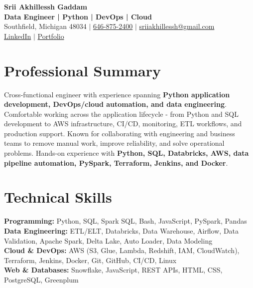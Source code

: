 \documentclass[letterpaper,10pt]{article}
\begin{document}
\fontsize{9.35pt}{10.45pt}\selectfont

\begin{center}
    {\LARGE \textbf{Srii Akhillessh Gaddam}} \\[-1pt]
    \textbf{Data Engineer | Python | DevOps | Cloud} \\[2pt]
    Southfield, Michigan 48034 $|$
    \href{tel:6468752400}{646-875-2400} $|$
    \href{mailto:sriiakhillessh@gmail.com}{sriiakhillessh@gmail.com} \\[1pt]
    \href{https://www.linkedin.com/in/srii-akhiilessh-gaddam-b48668191/}{LinkedIn} $|$
    \href{https://sriiakhillesshg.github.io/portfolio/}{Portfolio}
\end{center}
\vspace{-8pt}

\section{Professional Summary}
\small{Cross-functional engineer with experience spanning \textbf{Python application development, DevOps/cloud automation, and data engineering}. Comfortable working across the application lifecycle - from Python and SQL development to AWS infrastructure, CI/CD, monitoring, ETL workflows, and production support. Known for collaborating with engineering and business teams to remove manual work, improve reliability, and solve operational problems. Hands-on experience with \textbf{Python, SQL, Databricks, AWS, data pipeline automation, PySpark, Terraform, Jenkins, and Docker}.}

\section{Technical Skills}
\small{
\textbf{Programming:} Python, SQL, Spark SQL, Bash, JavaScript, PySpark, Pandas \\
\textbf{Data Engineering:} ETL/ELT, Databricks, Data Warehouse, Airflow, Data Validation, Apache Spark, Delta Lake, Auto Loader, Data Modeling \\
\textbf{Cloud \& DevOps:} AWS (S3, Glue, Lambda, Redshift, IAM, CloudWatch), Terraform, Jenkins, Docker, Git, GitHub, CI/CD, Linux \\
\textbf{Web \& Databases:} Snowflake, JavaScript, REST APIs, HTML, CSS, PostgreSQL, Greenplum
}
\end{document}
